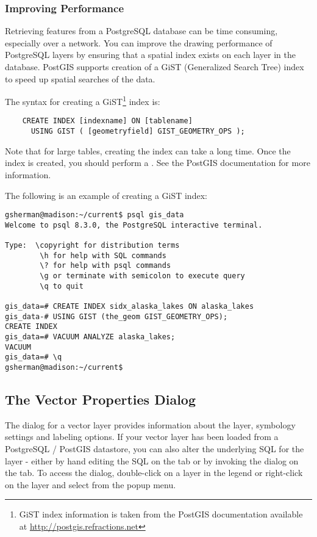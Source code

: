 \subsubsection{Improving Performance} \label{label_improve}

Retrieving features from a PostgreSQL database can be time consuming,
especially over a network. You can improve the drawing performance of
PostgreSQL layers by ensuring that a  spatial
index
exists on each layer in the database. PostGIS supports creation of a
 GiST
(Generalized Search Tree) index to speed up spatial searches of the data.

The syntax for creating a GiST\footnote{GiST index information is taken from the PostGIS
documentation available at \url{http://postgis.refractions.net}}
index is:

\begin{verbatim}
    CREATE INDEX [indexname] ON [tablename] 
      USING GIST ( [geometryfield] GIST_GEOMETRY_OPS );
\end{verbatim}

Note that for large tables, creating the index can take a long time. Once the
index is created, you should perform a . See the
PostGIS documentation \cite{PostGISweb} for more information.

The following is an example of creating a GiST index:
\begin{verbatim}
gsherman@madison:~/current$ psql gis_data
Welcome to psql 8.3.0, the PostgreSQL interactive terminal.

Type:  \copyright for distribution terms
        \h for help with SQL commands
        \? for help with psql commands
        \g or terminate with semicolon to execute query
        \q to quit

gis_data=# CREATE INDEX sidx_alaska_lakes ON alaska_lakes
gis_data-# USING GIST (the_geom GIST_GEOMETRY_OPS);
CREATE INDEX
gis_data=# VACUUM ANALYZE alaska_lakes;
VACUUM
gis_data=# \q
gsherman@madison:~/current$
\end{verbatim}

\subsection{The Vector Properties Dialog}\label{sec:vectorprops}

The  dialog for a vector layer 
provides information about the layer, symbology
settings and labeling options. If your vector layer has been loaded from a
PostgreSQL / PostGIS datastore, you can also alter the underlying SQL for the
layer - either by hand editing the SQL on the  tab or by
invoking the  dialog on the  tab. 
To access the
 dialog, double-click on a layer in the legend or right-click on the
layer and select  from the popup menu.

